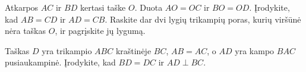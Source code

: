 \documentclass[12pt,a4paper,reqno]{amsart}
\theoremstyle{plain}\newtheorem{theorem}{Teorema}[section]
\theoremstyle{definition}
\theoremstyle{remark}\newtheorem{remark}[theorem]{Pastaba}\newtheorem*{remark*}{Pastaba}
\theoremstyle{definition}\newtheorem*{problem*}{Uždavinys}
\begin{document}
\begin{problem}\label{uzd:lygybe-susikirtimas-01} Atkarpos $AC$ ir $BD$ kertasi taške $O$. Duota $AO=OC$ ir $BO=OD$. Įrodykite, kad $AB=CD$ ir $AD=CB$. Raskite dar dvi lygių trikampių poras, kurių viršūnė nėra taškas $O$, ir pagrįskite jų lygumą. \end{problem}
\begin{center}
\end{center}
\begin{problem}\label{uzd:lygybe-pusiaukampine-01} Taškas $D$ yra trikampio $ABC$ kraštinėje $BC$, $AB=AC$, o $AD$ yra kampo $BAC$ pusiaukampinė. Įrodykite, kad $BD=DC$ ir $AD\perp BC$. \end{problem}
\end{document}
